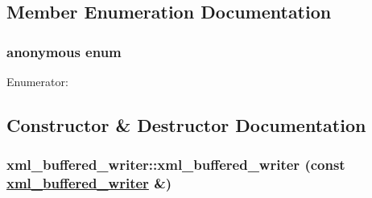 \subsection{Member Enumeration Documentation}
\hypertarget{classxml__buffered__writer_e80799461cc7c7c621ff75eb6835e7ce}{
\subsubsection["@4]{\setlength{\rightskip}{0pt plus 5cm}anonymous enum}}
\label{classxml__buffered__writer_e80799461cc7c7c621ff75eb6835e7ce}


\begin{Desc}
\item[Enumerator: ]\par
\begin{description}
\item[{\em 
\hypertarget{classxml__buffered__writer_e80799461cc7c7c621ff75eb6835e7ce9021e7b22ef17fba93b80380f0ffbbc8}{
bufcapacitybytes}
\label{classxml__buffered__writer_e80799461cc7c7c621ff75eb6835e7ce9021e7b22ef17fba93b80380f0ffbbc8}
}]\item[{\em 
\hypertarget{classxml__buffered__writer_e80799461cc7c7c621ff75eb6835e7ceb8b49b73105796783607f1f1ddd382cd}{
bufcapacity}
\label{classxml__buffered__writer_e80799461cc7c7c621ff75eb6835e7ceb8b49b73105796783607f1f1ddd382cd}
}]\end{description}
\end{Desc}



\subsection{Constructor \& Destructor Documentation}
\hypertarget{classxml__buffered__writer_6ab927cae021733a4b2e9e7cbbb79c13}{
\subsubsection[xml\_\-buffered\_\-writer]{\setlength{\rightskip}{0pt plus 5cm}xml\_\-buffered\_\-writer::xml\_\-buffered\_\-writer (const \hyperlink{classxml__buffered__writer}{xml\_\-buffered\_\-writer} \&)}}
\label{classxml__buffered__writer_6ab927cae021733a4b2e9e7cbbb79c13}


